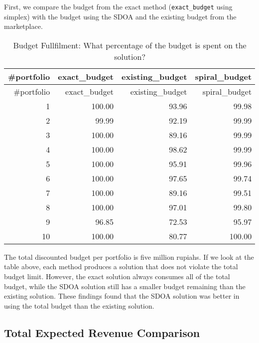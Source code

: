\documentclass[preprint, 3p,
authoryear]{elsarticle} %
\begin{document}
First, we compare the budget from the exact method
(\texttt{exact\_budget} using simplex) with the budget using the SDOA
and the existing budget from the marketplace.

\begin{longtable}[]{@{}rrrr@{}}
\caption{Budget Fullfilment: What percentage of the budget is spent on
the solution?}\tabularnewline
\toprule()
\#portfolio & exact\_budget & existing\_budget & spiral\_budget \\
\midrule()
\endfirsthead
\toprule()
\#portfolio & exact\_budget & existing\_budget & spiral\_budget \\
\midrule()
\endhead
1 & 100.00 & 93.96 & 99.98 \\
2 & 99.99 & 92.19 & 99.99 \\
3 & 100.00 & 89.16 & 99.99 \\
4 & 100.00 & 98.62 & 99.99 \\
5 & 100.00 & 95.91 & 99.96 \\
6 & 100.00 & 97.65 & 99.74 \\
7 & 100.00 & 89.16 & 99.51 \\
8 & 100.00 & 97.01 & 99.80 \\
9 & 96.85 & 72.53 & 95.97 \\
10 & 100.00 & 80.77 & 100.00 \\
\bottomrule()
\end{longtable}

The total discounted budget per portfolio is five million rupiahs. If we
look at the table above, each method produces a solution that does not
violate the total budget limit. However, the exact solution always
consumes all of the total budget, while the SDOA solution still has a
smaller budget remaining than the existing solution. These findings
found that the SDOA solution was better in using the total budget than
the existing solution.

\hypertarget{total-expected-revenue-comparison}{%
\subsection{Total Expected Revenue
Comparison}\label{total-expected-revenue-comparison}}
\end{document}
